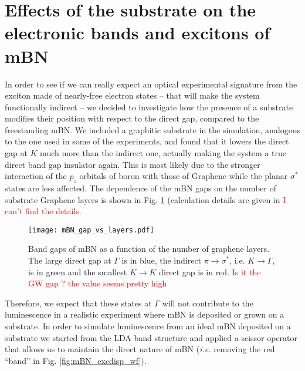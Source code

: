 \section{Effects of the substrate on the electronic bands and excitons of mBN} \label{sec:substrate}
In order to see if we can really expect an optical experimental signature from the exciton made of nearly-free electron states -- that will make the system functionally indirect -- we decided to investigate how the presence of a substrate modifies their position with respect to the direct gap, compared to the freestanding mBN. We included a graphitic substrate in the simulation, analogous to the one used in some of the experiments, and found that it lowers the direct gap at $K$ much more than the indirect one, actually making the system a true direct band gap insulator again. This is most likely due to the stronger interaction of the $p_z$ orbitals of boron with those of Graphene while the planar $\sigma^*$ states are less affected. The dependence of the mBN gaps on the number of substrate Graphene layers is shown in Fig. \ref{fig:mBN_gap_layers} (calculation details are given in \textcolor{red}{I can't find the details.}%
\begin{figure}[H]
	\vspace{0.2cm}
	\setcapindent{2em}
	\centering
	\texttt{[image: mBN\_gap\_vs\_layers.pdf]}
	\caption{Band gaps of mBN as a function of the number of graphene layers\label{gap_vs_layers}. The large direct gap at $\Gamma$ is in blue, the indirect $\pi\rightarrow\sigma^*$, i.e. $K\rightarrow\Gamma$, is in green and the smallest $K\rightarrow K$ direct gap is in red. \textcolor{red}{Is it the GW gap ? the value seems pretty high}} %
	\label{fig:mBN_gap_layers}
\end{figure}
Therefore, we expect that these states at $\Gamma$ will not contribute to the luminescence in a realistic experiment where mBN is deposited or grown on a substrate.
In order to simulate luminescence from an ideal mBN deposited on a substrate we started from the LDA band structure and applied a scissor operator that allows us to maintain the direct nature of mBN (\textit{i.e.} removing the red ``band'' in Fig. \ref{fig:mBN_excdisp_wf}). 

